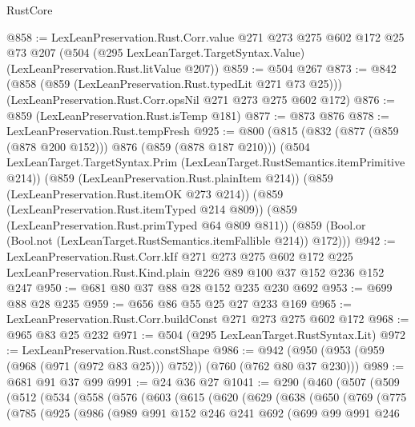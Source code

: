 \begin{lexlean}{RustCore}
\begin{coremodule}
{\begin{coremodule}
{{{{{@858 := LexLeanPreservation.Rust.Corr.value
    @271
    @273
    @275
    @602
    @172
    @25
    @73
    @207
    (@504 (@295 LexLeanTarget.TargetSyntax.Value) (LexLeanPreservation.Rust.litValue @207))
@859 := @504 @267
@873 := @842
    (@858 (@859 (LexLeanPreservation.Rust.typedLit @271 @73 @25)))
    (LexLeanPreservation.Rust.Corr.opsNil @271 @273 @275 @602 @172)
@876 := @859 (LexLeanPreservation.Rust.isTemp @181)
@877 := @873 @876
@878 := LexLeanPreservation.Rust.tempFresh
@925 := @800
    (@815
      (@832 (@877 (@859 (@878 @200 @152))) @876 (@859 (@878 @187 @210)))
      (@504 LexLeanTarget.TargetSyntax.Prim (LexLeanTarget.RustSemantics.itemPrimitive @214))
      (@859 (LexLeanPreservation.Rust.plainItem @214))
      (@859 (LexLeanPreservation.Rust.itemOK @273 @214))
      (@859 (LexLeanPreservation.Rust.itemTyped @214 @809))
      (@859 (LexLeanPreservation.Rust.primTyped @64 @809 @811))
      (@859 (Bool.or (Bool.not (LexLeanTarget.RustSemantics.itemFallible @214)) @172)))
@942 := LexLeanPreservation.Rust.Corr.kIf
    @271
    @273
    @275
    @602
    @172
    @225
    LexLeanPreservation.Rust.Kind.plain
    @226
    @89
    @100
    @37
    @152
    @236
    @152
    @247
@950 := @681 @80 @37 @88 @28 @152 @235 @230 @692
@953 := @699 @88 @28 @235
@959 := @656 @86 @55 @25 @27 @233 @169
@965 := LexLeanPreservation.Rust.Corr.buildConst @271 @273 @275 @602 @172
@968 := @965 @83 @25 @232
@971 := @504 (@295 LexLeanTarget.RustSyntax.Lit)
@972 := LexLeanPreservation.Rust.constShape
@986 := @942 (@950 (@953 (@959 (@968 (@971 (@972 @83 @25))) @752)) (@760 (@762 @80 @37 @230)))
@989 := @681 @91 @37 @99
@991 := @24 @36 @27
@1041 := @290
    (@460
      (@507
        (@509
          (@512
            (@534
              (@558
                (@576
                  (@603
                    (@615
                      (@620
                        (@629
                          (@638
                            (@650
                              (@769
                                (@775
                                  (@785
                                    (@925
                                      (@986
                                        (@989
                                          @991
                                          @152
                                          @246
                                          @241
                                          @692
                                          (@699
                                            @99
                                            @991
                                            @246
}}}}}
\end{coremodule}}
\end{coremodule}
\end{lexlean}
